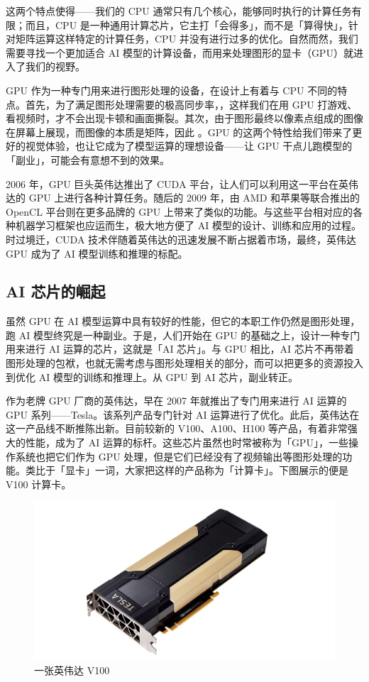 这两个特点使得——我们的 CPU 通常只有几个核心，能够同时执行的计算任务有限；而且，CPU 是一种通用计算芯片，它主打「会得多」，而不是「算得快」，针对矩阵运算这样特定的计算任务，CPU 并没有进行过多的优化。自然而然，我们需要寻找一个更加适合 AI 模型的计算设备，而用来处理图形的显卡（GPU）就进入了我们的视野。

GPU 作为一种专门用来进行图形处理的设备，在设计上有着与 CPU 不同的特点。首先，为了满足图形处理需要的极高同步率，，这样我们在用 GPU 打游戏、看视频时，才不会出现卡顿和画面撕裂。其次，由于图形最终以像素点组成的图像在屏幕上展现，而图像的本质是矩阵，因此 。GPU 的这两个特性给我们带来了更好的视觉体验，也让它成为了模型运算的理想设备——让 GPU 干点儿跑模型的「副业」，可能会有意想不到的效果。

2006 年，GPU 巨头英伟达推出了 CUDA 平台，让人们可以利用这一平台在英伟达的 GPU 上进行各种计算任务。随后的 2009 年，由 AMD 和苹果等联合推出的 OpenCL 平台则在更多品牌的 GPU 上带来了类似的功能。与这些平台相对应的各种机器学习框架也应运而生，极大地方便了 AI 模型的设计、训练和应用的过程。时过境迁，CUDA 技术伴随着英伟达的迅速发展不断占据着市场，最终，英伟达 GPU 成为了 AI 模型训练和推理的标配。

\subsection{AI 芯片的崛起}

虽然 GPU 在 AI 模型运算中具有较好的性能，但它的本职工作仍然是图形处理，跑 AI 模型终究是一种副业。于是，人们开始在 GPU 的基础之上，设计一种专门用来进行 AI 运算的芯片，这就是「AI 芯片」。与 GPU 相比，AI 芯片不再带着图形处理的包袱，也就无需考虑与图形处理相关的部分，而可以把更多的资源投入到优化 AI 模型的训练和推理上。从 GPU 到 AI 芯片，副业转正。

作为老牌 GPU 厂商的英伟达，早在 2007 年就推出了专门用来进行 AI 运算的 GPU 系列——Tesla。该系列产品专门针对 AI 运算进行了优化。此后，英伟达在这一产品线不断推陈出新。目前较新的 V100、A100、H100 等产品，有着非常强大的性能，成为了 AI 运算的标杆。这些芯片虽然也时常被称为「GPU」，一些操作系统也把它们作为 GPU 处理，但是它们已经没有了视频输出等图形处理的功能。类比于「显卡」一词，大家把这样的产品称为「计算卡」。下图展示的便是 V100 计算卡。

\begin{figure}[htb!]
  \centering
  \includegraphics[width=.7\textwidth]{assets/surpass/V100.jpg}
  \caption{一张英伟达 V100}
  \label{fig:V100}
\end{figure}

